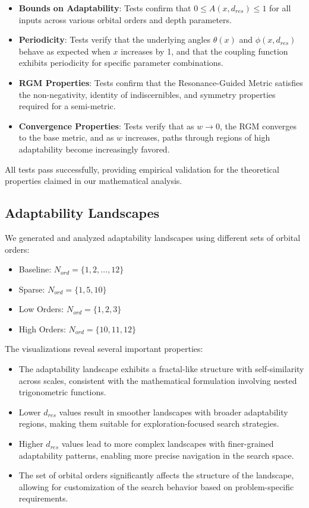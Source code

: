 \documentclass{article}
\begin{document}
\begin{itemize}
    \item \textbf{Bounds on Adaptability}: Tests confirm that $0 \leq A(x, d_{res}) \leq 1$ for all inputs across various orbital orders and depth parameters.
    \item \textbf{Periodicity}: Tests verify that the underlying angles $\theta(x)$ and $\phi(x, d_{res})$ behave as expected when $x$ increases by 1, and that the coupling function exhibits periodicity for specific parameter combinations.
    \item \textbf{RGM Properties}: Tests confirm that the Resonance-Guided Metric satisfies the non-negativity, identity of indiscernibles, and symmetry properties required for a semi-metric.
    \item \textbf{Convergence Properties}: Tests verify that as $w \to 0$, the RGM converges to the base metric, and as $w$ increases, paths through regions of high adaptability become increasingly favored.
\end{itemize}

All tests pass successfully, providing empirical validation for the theoretical properties claimed in our mathematical analysis.

\subsection{Adaptability Landscapes}
We generated and analyzed adaptability landscapes using different sets of orbital orders:

\begin{itemize}
    \item Baseline: $N_{ord} = \{1, 2, \ldots, 12\}$
    \item Sparse: $N_{ord} = \{1, 5, 10\}$
    \item Low Orders: $N_{ord} = \{1, 2, 3\}$
    \item High Orders: $N_{ord} = \{10, 11, 12\}$
\end{itemize}

The visualizations reveal several important properties:
\begin{itemize}
    \item The adaptability landscape exhibits a fractal-like structure with self-similarity across scales, consistent with the mathematical formulation involving nested trigonometric functions.
    \item Lower $d_{res}$ values result in smoother landscapes with broader adaptability regions, making them suitable for exploration-focused search strategies.
    \item Higher $d_{res}$ values lead to more complex landscapes with finer-grained adaptability patterns, enabling more precise navigation in the search space.
    \item The set of orbital orders significantly affects the structure of the landscape, allowing for customization of the search behavior based on problem-specific requirements.
\end{itemize}
\end{document}
